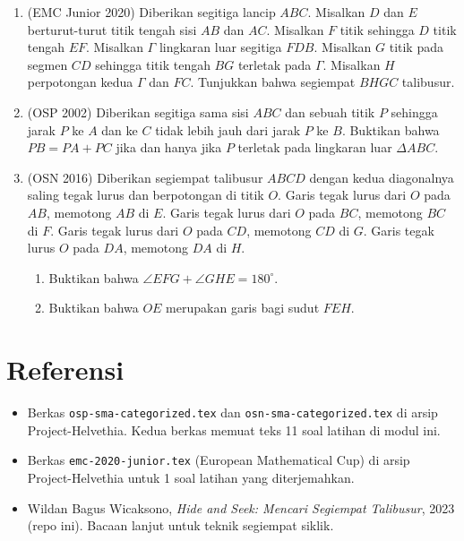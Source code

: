 \documentclass[12pt]{scrartcl}
\begin{document}
\begin{enumerate}[resume]

	\item (EMC Junior 2020)
	Diberikan segitiga lancip $ABC$. Misalkan $D$ dan $E$ berturut-turut titik tengah sisi $AB$ dan $AC$. Misalkan $F$ titik sehingga $D$ titik tengah $EF$. Misalkan $\Gamma$ lingkaran luar segitiga $FDB$. Misalkan $G$ titik pada segmen $CD$ sehingga titik tengah $BG$ terletak pada $\Gamma$. Misalkan $H$ perpotongan kedua $\Gamma$ dan $FC$. Tunjukkan bahwa segiempat $BHGC$ talibusur.

	\item (OSP 2002)
	Diberikan segitiga sama sisi $ABC$ dan sebuah titik $P$ sehingga jarak $P$ ke $A$ dan ke $C$ tidak lebih jauh dari jarak $P$ ke $B$. Buktikan bahwa $PB=PA+PC$ jika dan hanya jika $P$ terletak pada lingkaran luar $\Delta ABC$.

	\item (OSN 2016)
	Diberikan segiempat talibusur $ABCD$ dengan kedua diagonalnya saling tegak lurus dan berpotongan di titik $O$. Garis tegak lurus dari $O$ pada $AB$, memotong $AB$ di $E$. Garis tegak lurus dari $O$ pada $BC$, memotong $BC$ di $F$. Garis tegak lurus dari $O$ pada $CD$, memotong $CD$ di $G$. Garis tegak lurus $O$ pada $DA$, memotong $DA$ di $H$.
	\begin{enumerate}
	    \item[(a)] Buktikan bahwa $\angle EFG+\angle GHE=180^{\circ}$.
	    \item[(b)] Buktikan bahwa $OE$ merupakan garis bagi sudut $FEH$.
	\end{enumerate}

\end{enumerate}

\section{Referensi}
\begin{itemize}
    \item Berkas \texttt{osp-sma-categorized.tex} dan
    \texttt{osn-sma-categorized.tex} di arsip Project-Helvethia. Kedua
    berkas memuat teks 11 soal latihan di modul ini.
    \item Berkas \texttt{emc-2020-junior.tex} (European Mathematical
    Cup) di arsip Project-Helvethia untuk 1 soal latihan yang
    diterjemahkan.
    \item Wildan Bagus Wicaksono, \textit{Hide and Seek: Mencari
    Segiempat Talibusur}, 2023 (repo ini). Bacaan lanjut untuk teknik
    segiempat siklik.
\end{itemize}
\end{document}
